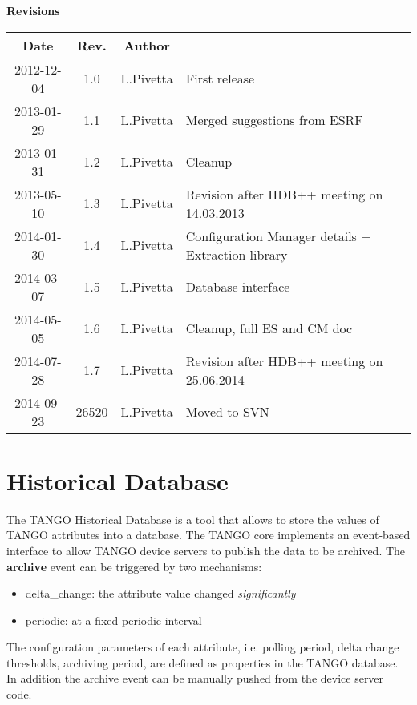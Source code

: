\documentclass[11pt,a4paper]{article}
\def \cm{Configuration Manager}
\def \tango{TANGO}
\begin{document}
\begin{Large}
	\textbf{Revisions}
\end{Large}
\begin{table}[!htb]
	\begin{tabular}{|c|c|c|l|}
		\hline
		\bf{Date} & \bf{Rev.} & \bf{Author} & \\
		\hline
		2012-12-04 & 1.0 & L.Pivetta & First release \\
		2013-01-29 & 1.1 & L.Pivetta & Merged suggestions from ESRF \\
		2013-01-31 & 1.2 & L.Pivetta & Cleanup \\
		2013-05-10 & 1.3 & L.Pivetta & Revision after HDB++ meeting on 14.03.2013 \\
		2014-01-30 & 1.4 & L.Pivetta & \cm{} details + Extraction library \\
		2014-03-07 & 1.5 & L.Pivetta & Database interface \\
		2014-05-05 & 1.6 & L.Pivetta & Cleanup, full ES and CM doc \\
		2014-07-28 & 1.7 & L.Pivetta & Revision after HDB++ meeting on 25.06.2014 \\
		2014-09-23 & 26520 & L.Pivetta & Moved to SVN \\
	\hline
	\end{tabular}
	\label{revisions}
\end{table}

\newpage{\clearpage}

\tableofcontents

\newpage{\clearpage}

\listoftables

\newpage{\clearpage}

\section{Historical Database}
The \tango{} Historical Database is a tool that allows to store the values
of \tango{} attributes into a database. The \tango{} core implements an
event-based interface to allow \tango{} device servers to publish the data
to be archived. The \textbf{archive} event can be triggered by two mechanisms:
\begin{itemize}
	\item delta\_change: the attribute value changed \emph{significantly}
	\item periodic: at a fixed periodic interval
\end{itemize}
The configuration parameters of each attribute, i.e. polling period, 
delta change thresholds, archiving period, are defined as properties
in the \tango{} database. In addition the archive event can be manually
pushed from the device server code.
\end{document}
